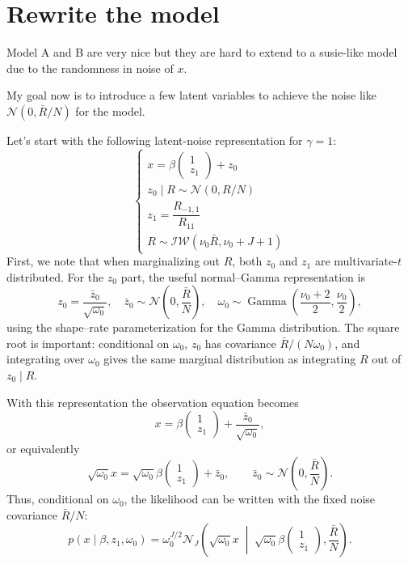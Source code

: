 \documentclass[11pt]{article}
\newcommand{\Gam}{\operatorname{Gamma}}
\newcommand{\Normal}{\mathcal N}
\begin{document}
\section{Rewrite the model}
Model A and B are very nice but they are hard to extend to a susie-like model due to the randomness in noise of $x$.

My goal now is to introduce a few latent variables to achieve the noise like
$\mathcal{N}(0,\bar R/N)$ for the model.

Let's start with the following latent-noise representation for $\gamma=1$:
\begin{equation}
\begin{cases}
x = \beta \begin{pmatrix} 1 \\ z_1\end{pmatrix} + z_0\\
z_0 \mid R \sim \mathcal{N}(0, R / N)\\
z_1 = \dfrac{R_{-1, 1}}{R_{11}}\\
R \sim \mathcal{IW}(\nu_0 \bar R, \nu_0 + J + 1)
\end{cases}
\end{equation}
First, we note that when marginalizing out $R$, both $z_0$ and $z_1$ are
multivariate-$t$ distributed. For the $z_0$ part, the useful normal--Gamma
representation is
\begin{equation}
z_0 = \dfrac{\bar z_0}{\sqrt{\omega_0}},
\quad
\bar z_0 \sim \Normal\left(0,\frac{\bar R}{N}\right),
\quad
\omega_0 \sim \Gam\left(\frac{\nu_0 + 2}{2},\frac{\nu_0}{2}\right),
\label{eq:z0-normal-gamma}
\end{equation}
using the shape--rate parameterization for the Gamma distribution. The square
root is important: conditional on $\omega_0$, $z_0$ has covariance
$\bar R/(N\omega_0)$, and integrating over $\omega_0$ gives the same marginal
distribution as integrating $R$ out of $z_0\mid R$.

With this representation the observation equation becomes
\[
x
=
\beta
\begin{pmatrix}
1\\ z_1
\end{pmatrix}
+\frac{\bar z_0}{\sqrt{\omega_0}},
\]
or equivalently
\begin{equation}\label{eq:fixed-noise-rewrite}
\sqrt{\omega_0}x
=
\sqrt{\omega_0}\beta
\begin{pmatrix}
1\\ z_1
\end{pmatrix}
+\bar z_0,
\qquad
\bar z_0\sim \Normal\left(0,\frac{\bar R}{N}\right).
\end{equation}
Thus, conditional on $\omega_0$, the likelihood can be written with the fixed
noise covariance $\bar R/N$:
\[
p(x\mid \beta,z_1,\omega_0)
=
\omega_0^{J/2}
\Normal_J\left(
\sqrt{\omega_0}x
\;\middle|\;
\sqrt{\omega_0}\beta
\begin{pmatrix}
1\\ z_1
\end{pmatrix},
\frac{\bar R}{N}
\right).
\]
\end{document}
